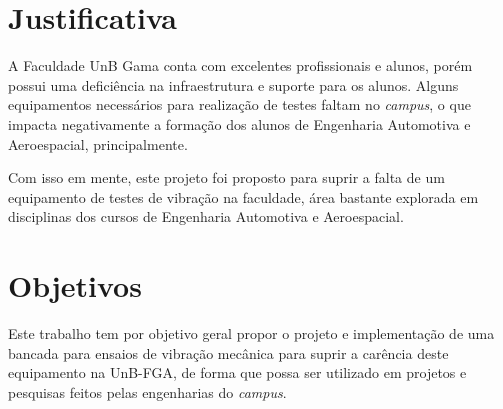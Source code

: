 \section{Justificativa}
    A Faculdade UnB Gama conta com excelentes profissionais e alunos, porém possui uma deficiência na infraestrutura e suporte para os alunos. Alguns equipamentos
    necessários para realização de testes faltam no \textit{campus}, o que
    impacta negativamente a formação dos alunos de Engenharia
    Automotiva e Aeroespacial, principalmente.
    
    Com isso em mente, este projeto foi proposto para suprir a falta de
    um equipamento de testes de vibração na faculdade, área bastante explorada
    em disciplinas dos cursos de Engenharia Automotiva e Aeroespacial.

\section{Objetivos}

    
    Este trabalho tem por objetivo geral propor o projeto e implementação de uma bancada para ensaios de vibração mecânica para suprir a carência deste equipamento na UnB-FGA, de forma que possa ser utilizado em projetos e pesquisas feitos pelas engenharias do \textit{campus}.
    
	
